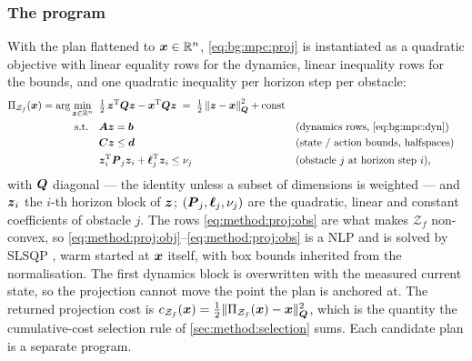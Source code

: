 \subsubsection*{The program}

With the plan flattened to $\boldsymbol{x}\in\mathbb{R}^{n}$, \eqref{eq:bg:mpc:proj} is instantiated as a
quadratic objective with linear equality rows for the dynamics, linear inequality rows for the
bounds, and one quadratic inequality per horizon step per obstacle:
\begin{align}
  \Pi_{\mathcal{Z}_{f}}(\boldsymbol{x})
    = \arg\min_{\boldsymbol{z}\in\mathbb{R}^{n}}\;\; &
       \tfrac{1}{2}\,\boldsymbol{z}^{\textrm{T}}\boldsymbol{Q}\boldsymbol{z} - \boldsymbol{x}^{\textrm{T}}\boldsymbol{Q}\boldsymbol{z}
       \;=\; \tfrac{1}{2}\left\|\boldsymbol{z}-\boldsymbol{x}\right\|_{\boldsymbol{Q}}^{2} + \text{const}
       \label{eq:method:proj:obj}\\
  \text{s.t.}\quad &
       \boldsymbol{A}\boldsymbol{z} = \boldsymbol{b}
       &&\text{(dynamics rows, \eqref{eq:bg:mpc:dyn})}
       \label{eq:method:proj:eq}\\
    & \boldsymbol{C}\boldsymbol{z} \le \boldsymbol{d}
       &&\text{(state / action bounds, halfspaces)}
       \label{eq:method:proj:ineq}\\
    & \boldsymbol{z}_{i}^{\textrm{T}}\boldsymbol{P}_{j}\boldsymbol{z}_{i} + \boldsymbol{\ell}_{j}^{\textrm{T}}\boldsymbol{z}_{i}
       \le \nu_{j}
       &&\text{(obstacle $j$ at horizon step $i$),}
       \label{eq:method:proj:obs}
\end{align}
with $\boldsymbol{Q}$ diagonal --- the identity unless a subset of dimensions is weighted --- and
$\boldsymbol{z}_{i}$ the $i$-th horizon block of $\boldsymbol{z}$; $(\boldsymbol{P}_{j},\boldsymbol{\ell}_{j},\nu_{j})$
are the quadratic, linear and constant coefficients of obstacle $j$. The rows \eqref{eq:method:proj:obs} are
what makes $\mathcal{Z}_{f}$ non-convex, so \eqref{eq:method:proj:obj}--\eqref{eq:method:proj:obs}
is a \ac{NLP} and is solved by SLSQP \parencite{kraft1988software,virtanen2020scipy}, warm
started at $\boldsymbol{x}$ itself, with box bounds inherited from the normalisation. The first
dynamics block is overwritten with the measured current state, so the projection cannot move the
point the plan is anchored at. The returned projection cost is
$c_{\mathcal{Z}_{f}}(\boldsymbol{x}) = \tfrac{1}{2}\|\Pi_{\mathcal{Z}_{f}}(\boldsymbol{x})-\boldsymbol{x}\|_{\boldsymbol{Q}}^{2}$,
which is the quantity the cumulative-cost selection rule of \autoref{sec:method:selection} sums.
Each candidate plan is a separate program.

